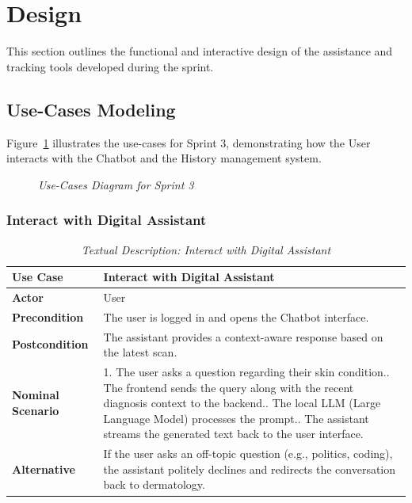 \section{Design}
This section outlines the functional and interactive design of the assistance and tracking tools developed during the sprint.

\subsection{Use-Cases Modeling}
Figure~\ref{fig:sprint3_usecase} illustrates the use-cases for Sprint 3, demonstrating how the User interacts with the Chatbot and the History management system.

\begin{figure}[H]
	\centering
	\caption{\textit{Use-Cases Diagram for Sprint 3}}
	\label{fig:sprint3_usecase}
\end{figure}

\subsubsection{Interact with Digital Assistant}
\begin{table}[H]
	\centering
	\footnotesize
	\renewcommand{\arraystretch}{1.5}
	\begin{tabular}{|p{3cm}|p{11.5cm}|}
		\hline
		\rowcolor[HTML]{1F3864}
		{\color{white}\textbf{Use Case}} & {\color{white}\textbf{Interact with Digital Assistant}} \\
		\hline
		\textbf{Actor} & User \\
		\hline
		\textbf{Precondition} & The user is logged in and opens the Chatbot interface. \\
		\hline
		\textbf{Postcondition} & The assistant provides a context-aware response based on the latest scan. \\
		\hline
		\textbf{Nominal Scenario} & 
		1. The user asks a question regarding their skin condition.\newline
		2. The frontend sends the query along with the recent diagnosis context to the backend.\newline
		3. The local LLM (Large Language Model) processes the prompt.\newline
		4. The assistant streams the generated text back to the user interface. \\
		\hline
		\textbf{Alternative} & 
		If the user asks an off-topic question (e.g., politics, coding), the assistant politely declines and redirects the conversation back to dermatology. \\
		\hline
	\end{tabular}
	\caption{\textit{Textual Description: Interact with Digital Assistant}}
\end{table}

